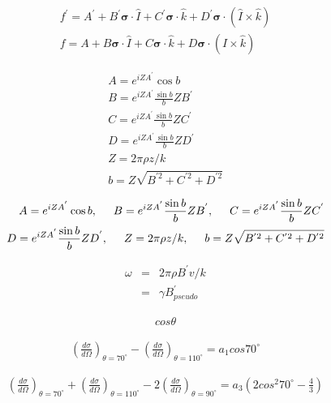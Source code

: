 \documentclass[11pt,a4paper]{jsarticle}
\begin{document}
\begin{eqnarray}
f^{'}=A^{'} + B^{'} {\pmb \sigma} \cdot \hat{I} +C ^{'}{\pmb \sigma} \cdot \hat{k}+D^{'} {\pmb \sigma} \cdot (\hat{I} \times \hat {k})   \nonumber \\
f=A + B {\pmb \sigma} \cdot \hat{I} +C{\pmb \sigma} \cdot \hat{k}+D {\pmb \sigma} \cdot (\hat{I} \times \hat {k})    \nonumber 
\end{eqnarray}


\begin{eqnarray}
A=e^{iZA^{'}} \cos b \nonumber\\
B=e^{iZA^{'}} \frac{\sin b}{b}ZB^{'} \nonumber\\
C=e^{iZA^{'}} \frac{\sin b}{b}ZC^{'} \nonumber\\
D=e^{iZA^{'}} \frac{\sin b}{b}ZD^{'} \nonumber\\
Z=2\pi\rho z/k  \nonumber\\
b=Z\sqrt{B^{'2}+C^{'2}+D^{'2}}
\end{eqnarray}

\begin{eqnarray}
A=e^{iZA^{'}} \cos b , \hspace{5mm}
B=e^{iZA^{'}} \frac{\sin b}{b}ZB^{'} ,  \hspace{5mm} 
C=e^{iZA^{'}} \frac{\sin b}{b}ZC^{'} \nonumber\\
D=e^{iZA^{'}} \frac{\sin b}{b}ZD^{'} ,   \hspace{5mm}
Z=2\pi\rho z/k  ,   \hspace{5mm}
b=Z\sqrt{B^{'2}+C^{'2}+D^{'2}}
\end{eqnarray}


\begin{eqnarray}
\omega & = & 2\pi\rho B^{'}v/k \\
 & = & \gamma B^{'}_{pseudo}
\end{eqnarray}




\begin{eqnarray}
cos\theta
\end{eqnarray}



\begin{eqnarray}
\left(\frac{d\sigma}{d\Omega}\right)_{\theta=70^{\circ}} - \left(\frac{d\sigma}{d\Omega}\right)_{\theta=110^{\circ}}
= a_{1} cos 70^\circ
\end{eqnarray}




\begin{eqnarray}
\left(\frac{d\sigma}{d\Omega}\right)_{\theta=70^{\circ}} + \left(\frac{d\sigma}{d\Omega}\right)_{\theta=110^{\circ}}
-2\left(\frac{d\sigma}{d\Omega}\right)_{\theta=90^{\circ}}
= a_{3}\left(2 cos^2 70^\circ  - \frac{4}{3} \right)
\end{eqnarray}
\end{document}
